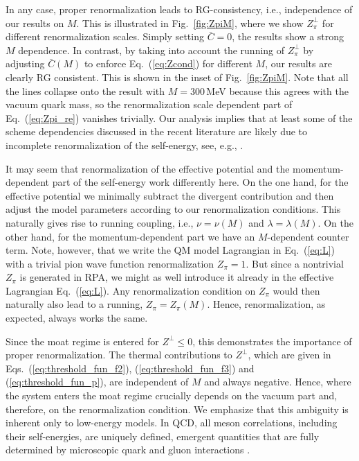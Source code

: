 \documentclass[reprint,english,superscriptaddress,preprintnumbers,amsmath,amssymb,aps,prd]{revtex4-2}
\def\eq#1{(\ref{#1})}
\def\Eq#1{Eq.~(\ref{#1})}
\def\Fig#1{Fig.~\ref{#1}}
\begin{document}
In any case, proper renormalization leads to RG-consistency, i.e., independence of our results on $M$. This is illustrated in \Fig{fig:ZpiM}, where we show $Z_\pi^\perp$ for different renormalization scales. Simply setting $\bar C  = 0$, the results show a strong $M$ dependence. In contrast, by taking into account the running of $Z_\pi^\perp$ by adjusting $\bar C(M)$ to enforce \Eq{eq:Zcond} for different $M$, our results are clearly RG consistent. This is shown in the inset of \Fig{fig:ZpiM}. Note that all the lines collapse onto the result with $M=300$\,MeV because this agrees with the vacuum quark mass, so the renormalization scale dependent part of \Eq{eq:Zpi_re} vanishes trivially. Our analysis implies that at least some of the scheme dependencies discussed in the recent literature are likely due to incomplete renormalization of the self-energy, see, e.g., \cite{Koenigstein:2023yzv, Pannullo:2024sov}.

It may seem that renormalization of the effective potential and the momentum-dependent part of the self-energy work differently here. On the one hand, for the effective potential we minimally subtract the divergent contribution and then adjust the model parameters according to our renormalization conditions. This naturally gives rise to running coupling, i.e., $\nu = \nu(M)$ and $\lambda = \lambda(M)$. On the other hand, for the momentum-dependent part we have an $M$-dependent counter term. Note, however, that we write the QM model Lagrangian in \Eq{eq:L} with a trivial pion wave function renormalization $Z_\pi = 1$. But since a nontrivial $Z_\pi$ is generated in RPA, we might as well introduce it already in the effective Lagrangian \Eq{eq:L}. Any renormalization condition on $Z_\pi$ would then naturally also lead to a running, $Z_\pi = Z_\pi(M)$. Hence, renormalization, as expected, always works the same.

Since the moat regime is entered for $Z^\perp\leq 0$, this demonstrates the importance of proper renormalization. The thermal contributions to $Z^\perp$, which are given in Eqs.\ \eq{eq:threshold_fun_f2}, \eq{eq:threshold_fun_f3} and \eq{eq:threshold_fun_p}, are independent of $M$ and always negative. Hence, where the system enters the moat regime crucially depends on the vacuum part and, therefore, on the renormalization condition. We emphasize that this ambiguity is inherent only to low-energy models. In QCD, all meson correlations, including their self-energies, are uniquely defined, emergent quantities that are fully determined by microscopic quark and gluon interactions \cite{Braun:2014ata, Rennecke:2015eba, Fu:2019hdw, Fu:2024rto}.
\end{document}
